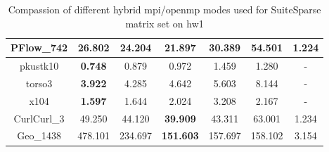 \begin{table}[h!]
\begin{tabular}{|c|c|c|c|c|c|c|}
PFlow\_742                                            & 26.802                                                    & 24.204                                                     & \textbf{21.897}                                           & 30.389                                                     & 54.501                                                     & 1.224                                                            \\ \hline
pkustk10                                              & \textbf{0.748}                                            & 0.879                                                      & 0.972                                                     & 1.459                                                      & 1.280                                                      & -                                                                \\ \hline
torso3                                                & \textbf{3.922}                                            & 4.285                                                      & 4.642                                                     & 5.603                                                      & 8.144                                                      & -                                                                \\ \hline
x104                                                  & \textbf{1.597}                                            & 1.644                                                      & 2.024                                                     & 3.208                                                      & 2.167                                                      & -                                                                \\ \hline
CurlCurl\_3                                           & 49.250                                                    & 44.120                                                     & \textbf{39.909}                                           & 43.311                                                     & 63.001                                                     & 1.234                                                            \\ \hline
Geo\_1438                                             & 478.101                                                   & 234.697                                                    & \textbf{151.603}                                          & 157.697                                                    & 158.102                                                    & 3.154                                                            \\ \hline
\end{tabular}
\caption{Compassion of different hybrid \gls{mpi}/\gls{openmp} modes used for SuiteSparse matrix set on \gls{hw1}}
\label{fig:mpi-omp-suitesparse-hw1}
\end{table}




